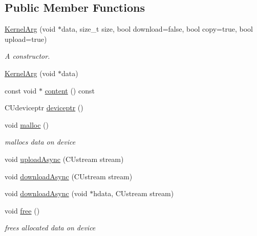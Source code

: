\subsection*{Public Member Functions}
\begin{DoxyCompactItemize}
\item 
\hyperlink{classyacx_1_1_kernel_arg_a10f9f7255e69ef20c0cad5ed4e091c94}{Kernel\+Arg} (void $\ast$data, size\+\_\+t size, bool download=false, bool copy=true, bool upload=true)
\begin{DoxyCompactList}\small\item\em A constructor. \end{DoxyCompactList}\item 
\hyperlink{classyacx_1_1_kernel_arg_a52d84ba8210a080a8cb6e38d4b09981b}{Kernel\+Arg} (void $\ast$data)
\item 
const void $\ast$ \hyperlink{classyacx_1_1_kernel_arg_ae2151181887d6023f66c3198f71c4a47}{content} () const
\item 
C\+Udeviceptr \hyperlink{classyacx_1_1_kernel_arg_aac6471e5799fa67a873f8736a9f9b5d5}{deviceptr} ()
\item 
\mbox{\label{classyacx_1_1_kernel_arg_a5dfe915de60f093466e9313c136aee4a}} 
void \hyperlink{classyacx_1_1_kernel_arg_a5dfe915de60f093466e9313c136aee4a}{malloc} ()
\begin{DoxyCompactList}\small\item\em mallocs data on device \end{DoxyCompactList}\item 
void \hyperlink{classyacx_1_1_kernel_arg_a28c10b39d51a27d30e0f3e60b6aea41e}{upload\+Async} (C\+Ustream stream)
\item 
void \hyperlink{classyacx_1_1_kernel_arg_abf4eb27a411c5f7396865398f4082441}{download\+Async} (C\+Ustream stream)
\item 
void \hyperlink{classyacx_1_1_kernel_arg_a0b58bafa9bb3b438a3a9e1f653ac53eb}{download\+Async} (void $\ast$hdata, C\+Ustream stream)
\item 
\mbox{\label{classyacx_1_1_kernel_arg_a2cffe32c3423fbbcfa54223103995b97}} 
void \hyperlink{classyacx_1_1_kernel_arg_a2cffe32c3423fbbcfa54223103995b97}{free} ()
\begin{DoxyCompactList}\small\item\em frees allocated data on device \end{DoxyCompactList}\item 

\end{DoxyCompactItemize}
